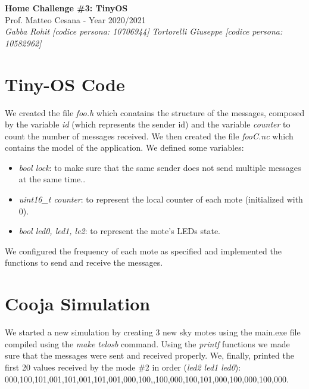 \documentclass{article}
\begin{document}
\begin{titlepage}
   \begin{center}
      \Huge\textbf{Home Challenge \#3: TinyOS}\\
      \vspace{5mm} %
      \Large Prof. Matteo Cesana - Year 2020/2021\\
      \vspace{5mm} %
      \large\textit{Gabba Rohit [codice persona: 10706944]}
      \linebreak
      \large\textit{Tortorelli Giuseppe [codice persona: 10582962]}
      \linebreak
      \linebreak
      \linebreak
      \linebreak
   \end{center}
\end{titlepage}

\pagebreak

\section{Tiny-OS Code}
We created the file \textit{foo.h} which conatains the structure of the messages, composed by the variable \textit{id} (which represents the sender id) and the variable \textit{counter} to count the number of messages received.
We then created the file \textit{fooC.nc} which contains the model of the application.
We defined some variables:
\begin{itemize}
   \item \textit{bool lock}: to make sure that the same sender does not send multiple messages at the same time..
   \item \textit{uint16\_t counter}: to represent the local counter of each mote (initialized with 0).
   \item \textit{bool led0, led1, le2}: to represent the mote's LEDs state.
\end{itemize}
We configured the frequency of each mote as specified and implemented the functions to send and receive the messages.

\section{Cooja Simulation}
We started a new simulation by creating 3 new sky motes using the main.exe file compiled using the \textit{make telosb} command.
Using the \textit{printf} functions we made sure that the messages were sent and received properly.
We, finally, printed the first 20 values received by the mode \#2 in order (\textit{led2 led1 led0}): 000,100,101,001,101,001,101,001,000,100,,100,000,100,101,000,100,000,100,000.
\end{document}
